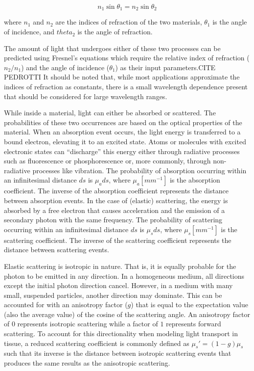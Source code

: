\begin{equation}
n_1 \sin \theta_1 = n_2 \sin \theta_2
\end{equation}

\noindent where $n_1$ and $n_2$ are the indices of refraction of the two materials, $\theta_1$ is the angle of incidence, and $theta_2$ is the angle of refraction.

The amount of light that undergoes either of these two processes can be predicted using Fresnel's equations which require the relative index of refraction ($n_2 / n_1$) and the angle of incidence ($\theta_1$) as their input parameters.CITE PEDROTTI It should be noted that, while most applications approximate the indices of refraction as constants, there is a small wavelength dependence present that should be considered for large wavelength ranges.\cite{Knight2013}

While inside a material, light can either be absorbed or scattered. The probabilities of these two occurrences are based on the optical properties of the material. When an absorption event occurs, the light energy is transferred to a bound electron, elevating it to an excited state.\cite{Jacques2004} Atoms or molecules with excited electronic states can ``discharge'' this energy either through radiative processes such as fluorescence or phosphorescence or, more commonly, through non-radiative processes like vibration. The probability of absorption occurring within an infinitesimal distance $ds$ is $\mu_ads$, where $\mu_a [mm^{-1}]$ is the absorption coefficient. The inverse of the absorption coefficient represents the distance between absorption events. In the case of (elastic) scattering, the energy is absorbed by a free electron that causes acceleration and the emission of a secondary photon with the same frequency.\cite{Jacques2004} The probability of scattering occurring within an infinitesimal distance $ds$ is $\mu_sds$, where $\mu_s [mm^{-1}]$ is the scattering coefficient. The inverse of the scattering coefficient represents the distance between scattering events.

Elastic scattering is isotropic in nature. That is, it is equally probable for the photon to be emitted in any direction. In a homogeneous medium, all directions except the initial photon direction cancel. However, in a medium with many small, suspended particles, another direction may dominate. This can be accounted for with an anisotropy factor ($g$) that is equal to the expectation value (also the average value) of the cosine of the scattering angle. An anisotropy factor of $0$ represents isotropic scattering while a factor of $1$ represents forward scattering. To account for this directionality when modeling light transport in tissue, a reduced scattering coefficient is commonly defined as $\mu_s'=(1-g)\mu_s$ such that its inverse is the distance between isotropic scattering events that produces the same results as the anisotropic scattering.\cite{Gratton2004}

